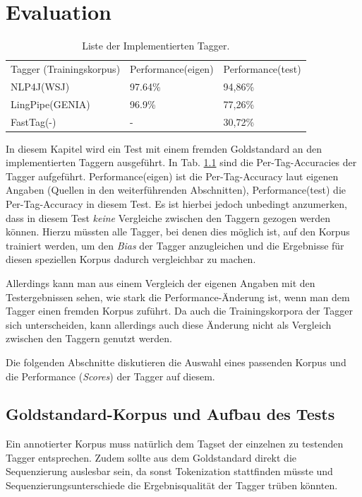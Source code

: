 %
\chapter{Evaluation}
\label{sec:eval}



\begin{table}[htb]
\centering
\begin{tabular}{l|l|l}
Tagger (Trainingskorpus) & Performance(eigen) & Performance(test)  \\
\cline{1-3}
NLP4J(WSJ)  & 97.64\% & 94,86\%	\\
LingPipe(GENIA) & 96.9\% & 77,26\%	\\
FastTag(-) & - & 30,72\%          
\end{tabular}
\vspace{3mm}
\caption{Liste der Implementierten Tagger. }
\label{sec:eval:list}
\end{table}

In diesem Kapitel wird ein Test mit einem fremden Goldstandard an den implementierten Taggern ausgeführt. In Tab. \ref{sec:eval:list} sind die Per-Tag-Accuracies der Tagger aufgeführt. Performance(eigen) ist die Per-Tag-Accuracy laut eigenen Angaben (Quellen in den weiterführenden Abschnitten), Performance(test) die Per-Tag-Accuracy in diesem Test. Es ist hierbei jedoch unbedingt anzumerken, dass in diesem Test \textit{keine} Vergleiche zwischen den Taggern gezogen werden können. Hierzu müssten alle Tagger, bei denen dies möglich ist, auf den Korpus trainiert werden, um den \textit{Bias} der Tagger anzugleichen und die Ergebnisse für diesen speziellen Korpus dadurch vergleichbar zu machen.

Allerdings kann man aus einem Vergleich der eigenen Angaben mit den Testergebnissen sehen, wie stark die Performance-Änderung ist, wenn man dem Tagger einen fremden Korpus zuführt. Da auch die Trainingskorpora der Tagger sich unterscheiden, kann allerdings auch diese Änderung nicht als Vergleich zwischen den Taggern genutzt werden.

Die folgenden Abschnitte diskutieren die Auswahl eines passenden Korpus und die Performance (\textit{Scores}) der Tagger auf diesem.

\section{Goldstandard-Korpus und Aufbau des Tests}
\label{sec:eval:corpus}

Ein annotierter Korpus muss natürlich dem Tagset der einzelnen zu testenden Tagger entsprechen. Zudem sollte aus dem Goldstandard direkt die Sequenzierung auslesbar sein, da sonst Tokenization stattfinden müsste und Sequenzierungsunterschiede die Ergebnisqualität der Tagger trüben könnten.

